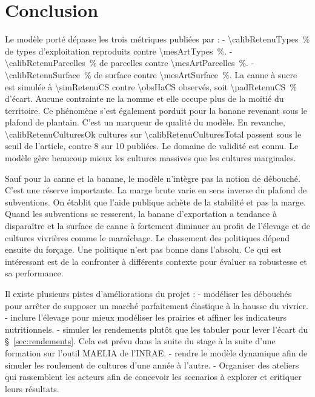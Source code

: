 \chapter*{Conclusion}

Le modèle porté dépasse les trois métriques publiées par \textcite{chopin2015} :
- \SI{\calibRetenuTypes}{\percent} de types d'exploitation reproduits contre \SI{\mesArtTypes}{\percent}.
- \SI{\calibRetenuParcelles}{\percent} de parcelles contre \SI{\mesArtParcelles}{\percent}.
- \SI{\calibRetenuSurface}{\percent} de surface contre \SI{\mesArtSurface}{\percent}.
La canne à sucre est simulée à \SI{\simRetenuCS}{\ha} contre \SI{\obsHaCS}{\ha} observés, 
soit \SI{\padRetenuCS}{\percent} d'écart. Aucune contrainte ne la nomme et elle occupe plus de la moitié du territoire. 
Ce phénomène s'est également porduit pour la banane revenant sous le plafond de plantain.
C'est un marqueur de qualité du modèle.
En revanche, \num{\calibRetenuCulturesOk} cultures sur \num{\calibRetenuCulturesTotal} 
passent sous le seuil de l'article, contre \num{8} sur \num{10} publiées. 
Le domaine de validité est connu. Le modèle gère beaucoup mieux les cultures massives que les cultures marginales.

Sauf pour la canne et la banane, le modèle n'intègre pas la notion de débouché. C'est une réserve importante.
La marge brute varie en sens inverse du plafond de subventions. On établit que l'aide publique 
achète de la stabilité et pas la marge. Quand les subventions se resserent, la banane 
d'exportation a tendance à disparaître et la surface de canne à fortement diminuer au profit de 
l'élevage et de cultures vivrières comme le maraîchage.
Le classement des politiques dépend ensuite du forçage. Une politique n'est pas bonne 
dans l'absolu. Ce qui est intéressant est de la confronter à différents contexte pour évaluer sa 
robustesse et sa performance.

Il existe plusieurs pistes d'améliorations du projet : 
- modéliser les débouchés pour arrêter de supposer un marché parfaitement élastique à la hausse du vivrier.
- inclure l'élevage pour mieux modéliser les prairies et affiner les indicateurs nutritionnels.
- simuler les rendements plutôt que les tabuler pour lever l'écart du §~\ref{sec:rendements}. Cela est prévu 
dans la suite du stage à la suite d'une formation sur l'outil MAELIA de l'INRAE.
- rendre le modèle dynamique afin de simuler les roulement de cultures d'une année à l'autre.
- Organiser des ateliers qui rassemblent les acteurs afin de concevoir les scenarios à explorer 
et critiquer leurs résultats.

